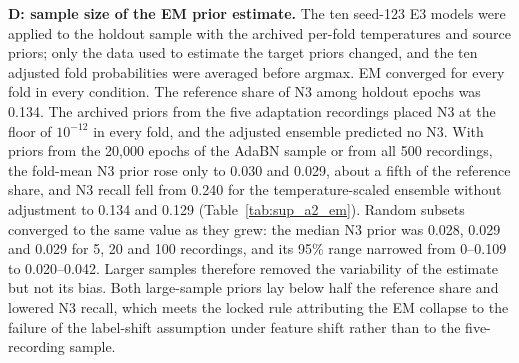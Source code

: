 \documentclass[10pt,a4paper]{article}
\begin{document}
\textbf{D: sample size of the EM prior estimate.} The ten seed-123 E3 models were applied to the holdout
sample with the archived per-fold temperatures and source priors; only the data used to estimate the
target priors changed, and the ten adjusted fold probabilities were averaged before argmax. EM
converged for every fold in every condition. The reference share of N3 among holdout epochs was 0.134.
The archived priors from the five adaptation recordings placed N3 at the floor of $10^{-12}$ in every
fold, and the adjusted ensemble predicted no N3. With priors from the 20{,}000 epochs of the AdaBN sample
or from all 500 recordings, the fold-mean N3 prior rose only to 0.030 and 0.029, about a fifth of the
reference share, and N3 recall fell from 0.240 for the temperature-scaled ensemble without adjustment to
0.134 and 0.129 (Table~\ref{tab:sup_a2_em}). Random subsets converged to the same value as they grew:
the median N3 prior was 0.028, 0.029 and 0.029 for 5, 20 and 100 recordings, and its 95\% range narrowed
from 0--0.109 to 0.020--0.042. Larger samples therefore removed the variability of the estimate but not
its bias. Both large-sample priors lay below half the reference share and lowered N3 recall, which
meets the locked rule attributing the EM collapse to the failure of the label-shift assumption under
feature shift rather than to the five-recording sample.
\end{document}
